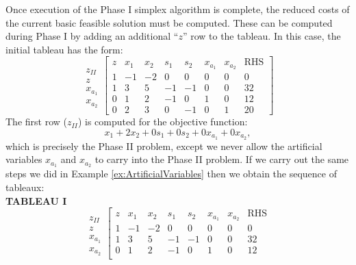 \begin{example} Once execution of the Phase I simplex algorithm is complete, the reduced costs of the current basic feasible solution must be computed. These can be computed during Phase I by adding an additional ``$z$'' row to the tableau. In this case, the initial tableau has the form:
\begin{equation}
\begin{array}{c}
\\
z_{II}\\
z\\
x_{a_1}\\
x_{a_2}
\end{array}
\left[
\begin{array}{c|cccccc|c}
z & x_1 & x_2 & s_1 & s_2 & x_{a_1} & x_{a_2} & \text{RHS}\\
\hline
1 & -1 & -2 & 0 & 0 & 0 & 0 & 0\\
\hline
1 & 3 & 5 & -1 & -1 & 0 & 0 & 32\\
\hline
0 & 1 & 2 & -1 & 0  & 1 & 0 & 12\\
0 & 2 & 3 & 0  & -1 & 0 & 1 & 20
\end{array}
\right]
\end{equation}
The first row ($z_{II}$) is computed for the objective function:
\begin{equation}
x_1 + 2x_2 + 0s_1 + 0s_2 + 0x_{a_1} + 0x_{a_2},
\end{equation}
which is precisely the Phase II problem, except we never allow the artificial variables $x_{a_1}$ and $x_{a_2}$ to carry into the Phase II problem. If we carry out the same steps we did in Example \ref{ex:ArtificialVariables} then we obtain the sequence of tableaux:\\
\noindent\textbf{TABLEAU I}
\begin{displaymath}
\begin{array}{c}
\\
z_{II}\\
z\\
x_{a_1}\\
x_{a_2}
\end{array}
\left[
\begin{array}{c|cccccc|c}
z & x_1 & x_2 & s_1 & s_2 & x_{a_1} & x_{a_2} & \text{RHS}\\
\hline
1 & -1 & -2 & 0 & 0 & 0 & 0 & 0\\
\hline
1 & 3 & 5 & -1 & -1 & 0 & 0 & 32\\
\hline
0 & 1 & 2 & -1 & 0  & 1 & 0 & 12\\

\end{array}
\end{displaymath}
\end{example}
